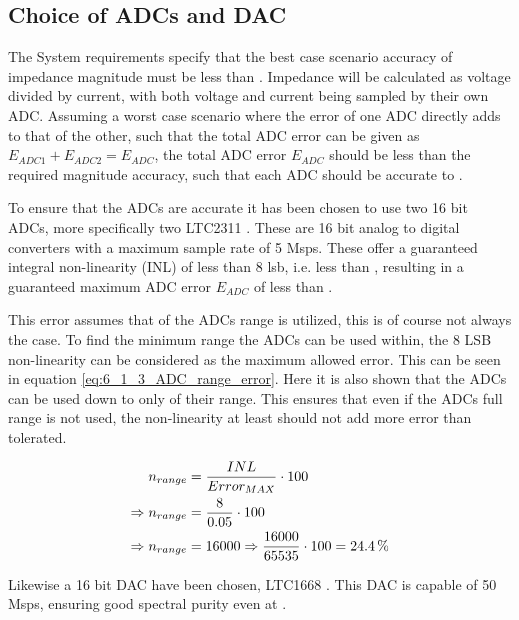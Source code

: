 \subsection{Choice of ADCs and DAC} \label{subsec:ADC_DAC_Choice}
The System requirements specify that the best case scenario accuracy of impedance magnitude must be less than . Impedance will be calculated as voltage divided by current, with both voltage and current being sampled by their own ADC. Assuming a worst case scenario where the error of one ADC directly adds to that of the other, such that the total ADC error can be given as $E_{ADC1}+E_{ADC2} = E_{ADC}$, the total ADC error $E_{ADC}$ should be less than the required magnitude accuracy, such that each ADC should be accurate to .

To ensure that the ADCs are accurate it has been chosen to use two 16 bit ADCs, more specifically two LTC2311 \cite{ADC_LTC2311}. These are 16 bit analog to digital converters with a maximum sample rate of 5 Msps. These offer a guaranteed integral non-linearity (INL) of less than 8 lsb, i.e. less than , resulting in a guaranteed maximum ADC error $E_{ADC}$ of less than .

This error assumes that  of the ADCs range is utilized, this is of course not always the case. To find the minimum range the ADCs can be used within, the 8 LSB non-linearity can be considered as the maximum allowed  error. This can be seen in equation \ref{eq:6_1_3_ADC_range_error}. Here it is also shown that the ADCs can be used down to only  of their range. This ensures that even if the ADCs full range is not used, the non-linearity at least should not add more error than tolerated.

\begin{equation}
\begin{split}
    \label{eq:6_1_3_ADC_range_error}
    n_{range} &= \frac{INL}{Error_{MAX}} \cdot 100 \\
    \Rightarrow n_{range} &= \frac{8}{0.05} \cdot 100 \\
    \Rightarrow n_{range} & = 16000 \Rightarrow \frac{16000}{65535}\cdot 100 = \SI{24.4}{\%}
\end{split}
\end{equation}

Likewise a 16 bit DAC have been chosen, LTC1668 \cite{DAC_LTC1668}. This DAC is capable of 50 Msps, ensuring good spectral purity even at .